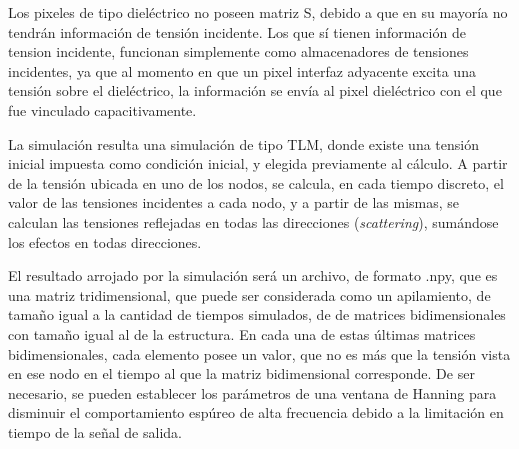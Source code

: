 \begin{enumerate}
	Los pixeles de tipo dieléctrico no poseen matriz S, debido a que en su mayoría no tendrán información de tensión incidente. Los que sí tienen información de tension incidente, funcionan simplemente como almacenadores de tensiones incidentes, ya que al momento en que un pixel interfaz adyacente excita una tensión sobre el dieléctrico, la información se envía al pixel dieléctrico con el que fue vinculado capacitivamente.
\end{enumerate}
	
La simulación resulta una simulación de tipo TLM, donde existe una tensión inicial impuesta como condición inicial, y elegida previamente al cálculo. A partir de la tensión ubicada en uno de los nodos, se calcula, en cada tiempo discreto, el valor de las tensiones incidentes a cada nodo, y a partir de las mismas, se calculan las tensiones reflejadas en todas las direcciones (\textit{scattering}), sumándose los efectos en todas direcciones.

El resultado arrojado por la simulación será un archivo, de formato .npy, que es una matriz tridimensional, que puede ser considerada como un apilamiento, de tamaño igual a la cantidad de tiempos simulados, de de matrices bidimensionales con tamaño igual al de la estructura. En cada una de estas últimas matrices bidimensionales, cada elemento posee un valor, que no es más que la tensión vista en ese nodo en el tiempo al que la matriz bidimensional corresponde. De ser necesario, se pueden establecer los parámetros de una ventana de Hanning para disminuir el comportamiento espúreo de alta frecuencia debido a la limitación en tiempo de la señal de salida.